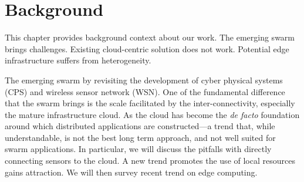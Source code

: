 \documentclass[thesis.tex]{subfiles}
\begin{document}
\chapter{Background}
\label{cha:background}

This chapter provides background context about our work. The emerging swarm
brings challenges. Existing cloud-centric solution does not work. Potential edge
infrastructure suffers from heterogeneity.

The emerging swarm by revisiting the development of cyber physical systems (CPS)
and wireless sensor network (WSN). One of the fundamental difference that the
swarm brings is the scale facilitated by the inter-connectivity, especially the
mature infrastructure cloud. As the cloud has become the \textit{de facto}
foundation around which distributed applications are constructed---a trend that,
while understandable, is not the best long term approach, and not well suited
for swarm applications. In particular, we will discuss the pitfalls with
directly connecting sensors to the cloud. A new trend promotes the use of local
resources gains attraction. We will then survey recent trend on edge computing.






\end{document}
